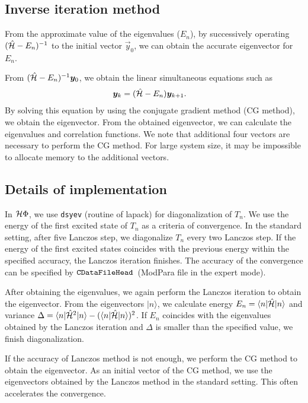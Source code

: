 \subsection{Inverse iteration method}

From the approximate value of the eigenvalues ($E_{n}$),
by successively operating $(\hat{\mathcal{H}}-E_{n})^{-1}$
to the initial vector $\vec{y}_{0}$,
we can obtain the accurate eigenvector for $E_{n}$.

From $(\hat{\mathcal{H}}-E_{n})^{-1}\boldsymbol y_{0}$,
we obtain the linear simultaneous equations such as  
\begin{align}
\boldsymbol y_{k}&=(\hat{\mathcal{H}}-E_{n})\boldsymbol y_{k+1}.
\end{align}
By solving this equation by using the
conjugate gradient method (CG method),
we obtain the eigenvector.
From the obtained eigenvector,
we can calculate the eigenvalues and correlation functions. 
We note that additional four vectors are necessary to
perform the CG method.
For large system size,
it may be impossible to allocate memory to the
additional vectors.

\subsection{Details of implementation}
In $\mathcal{H} \Phi$,
we use \verb|dsyev| (routine of lapack)
for diagonalization of $T_{n}$.
We use the energy of the first excited state of $T_{n}$
as a criteria of convergence. 
In the standard setting,
after five Lanczos step,
we diagonalize $T_{n}$ every two Lanczos step.
If the energy of the first excited states coincides with
the previous energy within the specified accuracy,
the Lanczos iteration finishes.
The accuracy of the convergence can be specified by 
$\verb|CDataFileHead|$~(ModPara file in the expert mode).

After obtaining the eigenvalues,
we again perform the Lanczos iteration
to obtain the eigenvector.
From the eigenvectors $|n\rangle$,
we calculate 
energy $E_{n}=\langle n|\hat{\mathcal{H}}|n\rangle $ and
variance $\Delta=\langle n|\hat{\mathcal{H}}^{2}|n\rangle -(\langle n|\hat{\mathcal{H}}|n\rangle)^2$.
If $E_{n}$ coincides with the eigenvalues obtained by the Lanczos iteration and 
$\Delta$ is smaller than the specified value,
we finish diagonalization.

If the accuracy of Lanczos method is not enough,
we perform the CG method to obtain the eigenvector.
As an initial vector of the CG method,
we use the eigenvectors obtained by the Lanczos method in the standard setting.
This often accelerates the convergence.
